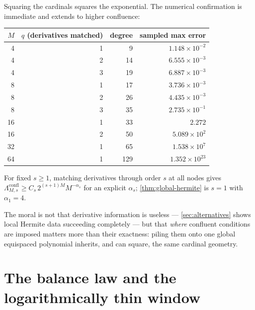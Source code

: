 \documentclass[11pt,oneside]{article}
\numberwithin{equation}{section}
\theoremstyle{definition}
\theoremstyle{remark}
\begin{document}
Squaring the cardinals squares the exponential.  The numerical
confirmation is immediate and extends to higher confluence:

\begin{center}
\small
\begin{tabular}{rrrr}
\toprule
$M$ & $q$ (derivatives matched) & degree & sampled max error \\
\midrule
4  & 1 & 9   & $1.148\times10^{-2}$ \\
4  & 2 & 14  & $6.555\times10^{-3}$ \\
4  & 3 & 19  & $6.887\times10^{-3}$ \\
8  & 1 & 17  & $3.736\times10^{-3}$ \\
8  & 2 & 26  & $4.435\times10^{-3}$ \\
8  & 3 & 35  & $2.735\times10^{-1}$ \\
16 & 1 & 33  & $2.272$ \\
16 & 2 & 50  & $5.089\times10^{2}$ \\
32 & 1 & 65  & $1.538\times10^{7}$ \\
64 & 1 & 129 & $1.352\times10^{23}$ \\
\bottomrule
\end{tabular}
\label{tab:full-hermite}
\end{center}

\begin{conjecture}
\label{conj:higher-hermite}
For fixed $s\ge1$, matching derivatives through order $s$ at all
nodes gives
$\Lambda^{\mathrm{confl}}_{M,s}\ge C_s\,2^{(s+1)M}M^{-\alpha_s}$ for
an explicit $\alpha_s$;
\cref{thm:global-hermite} is $s=1$ with $\alpha_1=4$.
\end{conjecture}

The moral is not that derivative information is useless ---
\cref{sec:alternatives} shows local Hermite data succeeding
completely --- but that \emph{where} confluent conditions are imposed
matters more than their exactness: piling them onto one global
equispaced polynomial inherits, and can square, the same cardinal
geometry.

\section{The balance law and the logarithmically thin window}
\label{sec:balance}
\end{document}
